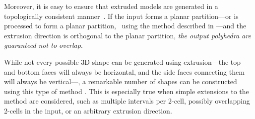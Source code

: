 Moreover, it is easy to ensure that extruded models are generated in a topologically consistent manner~\citep{Ledoux11a}.
If the input forms a planar partition---or is processed to form a planar partition, \eg\ using the method described in ---and the extrusion direction is orthogonal to the planar partition, \emph{the output polyhedra are guaranteed not to overlap}.

While not every possible 3D shape can be generated using extrusion---the top and bottom faces will always be horizontal, and the side faces connecting them will always be vertical---, a remarkable number of shapes can be constructed using this type of method \citep{Ferrucci93}.
This is especially true when simple extensions to the method are considered, such as multiple intervals per 2-cell, possibly overlapping 2-cells in the input, or an arbitrary extrusion direction.


